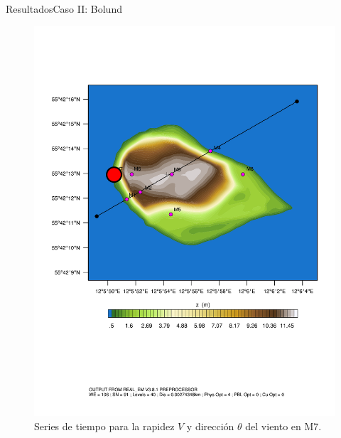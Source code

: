 \documentclass[mathserif,10pt]{beamer}
\begin{document}
\begin{frame}{Resultados}{Caso II: Bolund}
\begin{figure}[H]
\begin{minipage}{0.35\linewidth}
		\includegraphics[width=1\linewidth,page=1,trim={3.5cm 9.3cm 0.8cm 3.8cm},clip]{fig/05/ppt/bol_control_point7.pdf}%
	\end{minipage}%
		\vspace{-2mm}\caption{Series de tiempo para la rapidez $V$ y dirección $\theta$ del viento en M7.}
		\label{fig:06_bol_ts_m7}
	\end{figure}
\end{frame}
\end{document}
